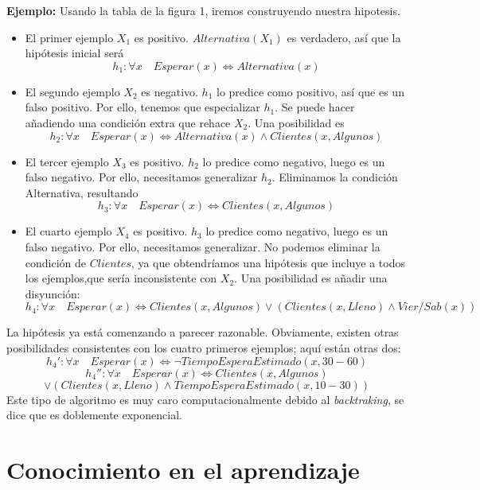 \documentclass[12 pt, a4paper]{article}
\begin{document}
			\textbf{Ejemplo:} Usando la tabla de la figura 1, iremos construyendo nuestra hipotesis.
			\begin{itemize}
				\item El primer ejemplo $X_{1}$ es positivo. $Alternativa(X_{1})$ es verdadero, así que la hipótesis inicial será
					$$h_{1}: \forall x \quad Esperar(x) \Leftrightarrow Alternativa(x)$$
				\item El segundo ejemplo $X_{2}$ es negativo. $h_{1}$ lo predice como positivo, así que es un falso positivo. Por ello, tenemos que especializar $h_{1}$. Se puede hacer añadiendo una condición extra que rehace $X_{2}$. Una posibilidad es
					$$h_{2}: \forall x \quad Esperar(x) \Leftrightarrow Alternativa(x) \land Clientes(x, Algunos)$$
				\item  El tercer ejemplo $X_{3}$ es positivo. $h_{2}$ lo predice como negativo, luego es un falso negativo. Por ello, necesitamos generalizar $h_{2}$. Eliminamos la condición Alternativa, resultando
					$$h_{3}:\forall  x\quad Esperar(x) \Leftrightarrow Clientes(x, Algunos)$$
				\item El cuarto ejemplo $X_{4}$ es positivo. $h_{3}$ lo predice como negativo, luego es un falso negativo. Por ello, necesitamos generalizar. No podemos eliminar la condición de $Clientes$, ya que obtendríamos una hipótesis que incluye a todos los ejemplos,que sería inconsistente con $X_{2}$. Una posibilidad es añadir una disyunción:
					$$h_{4}:\forall x\quad Esperar(x) \Leftrightarrow Clientes(x, Algunos)\lor (Clientes(x, Lleno) \land Vier/Sab(x))$$
			\end{itemize}
				
				La hipótesis ya está comenzando a parecer razonable. Obviamente, existen otras posibilidades consistentes con los cuatro primeros ejemplos; aquí están otras dos:
					$$h_{4}':\forall x\quad Esperar(x) \Leftrightarrow \neg TiempoEsperaEstimado(x, 30-60)$$
					$$h_{4}'':\forall x\quad Esperar(x) \Leftrightarrow Clientes(x, Algunos)$$ 
					$$\lor (Clientes(x, Lleno) \land TiempoEsperaEstimado(x, 10-30))$$
			Este tipo de algoritmo es muy caro computacionalmente debido al \emph{backtraking}, se dice que es doblemente exponencial.
			
			
	\section{Conocimiento en el aprendizaje}
\end{document}
